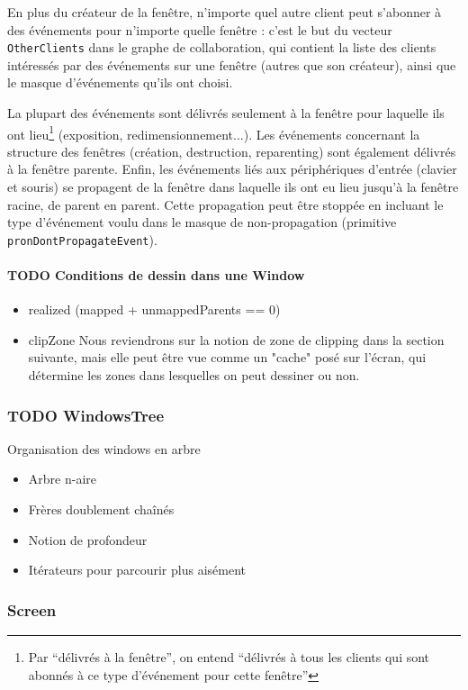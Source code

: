 En plus du créateur de la fenêtre, n'importe quel autre client peut s'abonner à des événements pour n'importe quelle fenêtre : c'est le but du vecteur \verb|OtherClients| dans le graphe de collaboration, qui contient la liste des clients intéressés par des événements sur une fenêtre (autres que son créateur), ainsi que le masque d'événements qu'ils ont choisi.

La plupart des événements sont délivrés seulement à la fenêtre pour laquelle ils ont lieu\footnote{Par ``délivrés à la fenêtre'', on entend ``délivrés à tous les clients qui sont abonnés à ce type d'événement pour cette fenêtre''} (exposition, redimensionnement...). Les événements concernant la structure des fenêtres (création, destruction, reparenting) sont également délivrés à la fenêtre parente. Enfin, les événements liés aux périphériques d'entrée (clavier et souris) se propagent de la fenêtre dans laquelle ils ont eu lieu jusqu'à la fenêtre racine, de parent en parent. Cette propagation peut être stoppée en incluant le type d'événement voulu dans le masque de non-propagation (primitive \verb|pronDontPropagateEvent|).

\paragraph{TODO Conditions de dessin dans une Window}
\begin{itemize}
  \item realized (mapped + unmappedParents == 0)
  \item clipZone Nous reviendrons sur la notion de zone de clipping dans la section suivante, mais elle peut être vue comme un "cache" posé sur l'écran, qui détermine les zones dans lesquelles on peut dessiner ou non.
\end{itemize}

\subsubsection{TODO WindowsTree}
Organisation des windows en arbre
\begin{itemize}
  \item Arbre n-aire
  \item Frères doublement chaînés
  \item Notion de profondeur
  \item Itérateurs pour parcourir plus aisément
\end{itemize}

\subsubsection{Screen}

